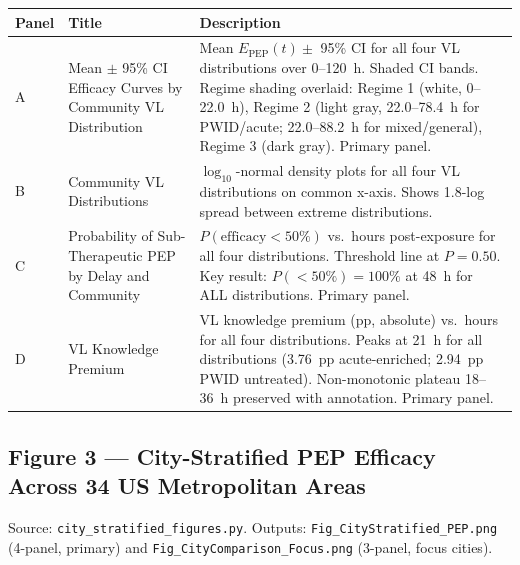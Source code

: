 \documentclass[11pt]{article}
\theoremstyle{definition}
\theoremstyle{remark}
\newcommand{\Epep}{E_{\text{PEP}}}
\begin{document}
\begin{table}[H]
\centering
\small
\begin{tabular}{@{}lp{4cm}p{8cm}@{}}
\toprule
\textbf{Panel} & \textbf{Title} & \textbf{Description} \\
\midrule
A & Mean $\pm$ 95\% CI Efficacy Curves by Community VL Distribution & Mean $\Epep(t) \pm$ 95\% CI for all four VL distributions over 0--120~h. Shaded CI bands. Regime shading overlaid: Regime 1 (white, 0--22.0~h), Regime 2 (light gray, 22.0--78.4~h for PWID/acute; 22.0--88.2~h for mixed/general), Regime 3 (dark gray). Primary panel. \\
B & Community VL Distributions & $\log_{10}$-normal density plots for all four VL distributions on common x-axis. Shows 1.8-log spread between extreme distributions. \\
C & Probability of Sub-Therapeutic PEP by Delay and Community & $P(\text{efficacy} < 50\%)$ vs.\ hours post-exposure for all four distributions. Threshold line at $P = 0.50$. Key result: $P(<50\%) = 100\%$ at 48~h for ALL distributions. Primary panel. \\
D & VL Knowledge Premium & VL knowledge premium (pp, absolute) vs.\ hours for all four distributions. Peaks at 21~h for all distributions (3.76~pp acute-enriched; 2.94~pp PWID untreated). Non-monotonic plateau 18--36~h preserved with annotation. Primary panel. \\
\bottomrule
\end{tabular}
\end{table}

\subsection{Figure 3 --- City-Stratified PEP Efficacy Across 34 US Metropolitan Areas}

Source: \texttt{city\_stratified\_figures.py}. Outputs: \texttt{Fig\_CityStratified\_PEP.png} (4-panel, primary) and \texttt{Fig\_CityComparison\_Focus.png} (3-panel, focus cities).
\end{document}

